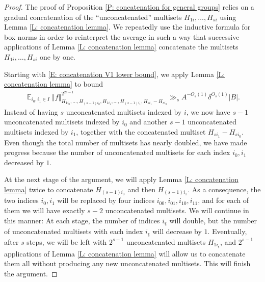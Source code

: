 \documentclass[11pt]{amsart}
\theoremstyle{definition}
\DeclareMathOperator*{\E}{\mathbb{E}}
\newcommand{\ueps}{{\underline{\epsilon}}}
\newcommand{\norm}[1]{\left\Vert #1\right\Vert}
\begin{document}
\begin{proof}
    The proof of Proposition \ref{P: concatenation for general groups} relies on a gradual concatenation of the ``unconcatenated'' multisets $H_{1i}, \ldots, H_{si}$ using Lemma \ref{L: concatenation lemma}. We repeatedly use the inductive formula for box norms in order to reinterpret the average in such a way  that successive applications of Lemma \ref{L: concatenation lemma} concatenate the multisets $H_{1i}, \ldots, H_{si}$ one by one. 

    

 Starting with \eqref{E: concatenation V1 lower bound}, we apply Lemma \ref{L: concatenation lemma} to bound
\begin{align}\label{E: concatenation s>2 1}
    \E_{i_0, i_1\in I}\norm{f}_{H_{1 i_0}, \ldots, H_{(s-1) i_0}, H_{1 i_1}, \ldots, H_{(s-1) i_1}, H_{s i_1}-H_{s i_0}}^{2^{2s-1}}\gg_{s} A^{-O_s(1)} \delta^{O_s(1)}|B|.
\end{align}
Instead of having $s$ unconcatenated multisets indexed by $i$, we now have $s-1$ unconcatenated multisets indexed by $i_0$ and another $s-1$ unconcatenated multisets indexed by $i_1$, together with the concatenated multiset $H_{s i_1}-H_{s i_0}$. Even though the total number of multisets has nearly doubled, we have made progress because the number of unconcatenated multisets for each index $i_0, i_1$ decreased by $1$. 

At the next stage of the argument, we will apply Lemma \ref{L: concatenation lemma} twice to concatenate $H_{(s-1) i_0}$ and then $H_{(s-1) i_1}$. As a consequence, the two indices $i_0, i_1$ will be replaced by four indices $i_{00}, i_{01}, i_{10}, i_{11}$, and for each of them we will have exactly $s-2$ unconcatenated multisets. 
We will continue in this manner: At each stage, the number of indices $i_\ueps$ will double, but the number of unconcatenated multisets with each index $i_\ueps$ will decrease by $1$.
Eventually, after $s$ steps, we will be left with $2^{s-1}$ unconcatenated multisets $H_{1 i_\ueps}$, and $2^{s-1}$ applications of Lemma \ref{L: concatenation lemma} will allow us to concatenate them all without producing any new unconcatenated multisets. This will finish the argument.


\end{proof}
\end{document}
